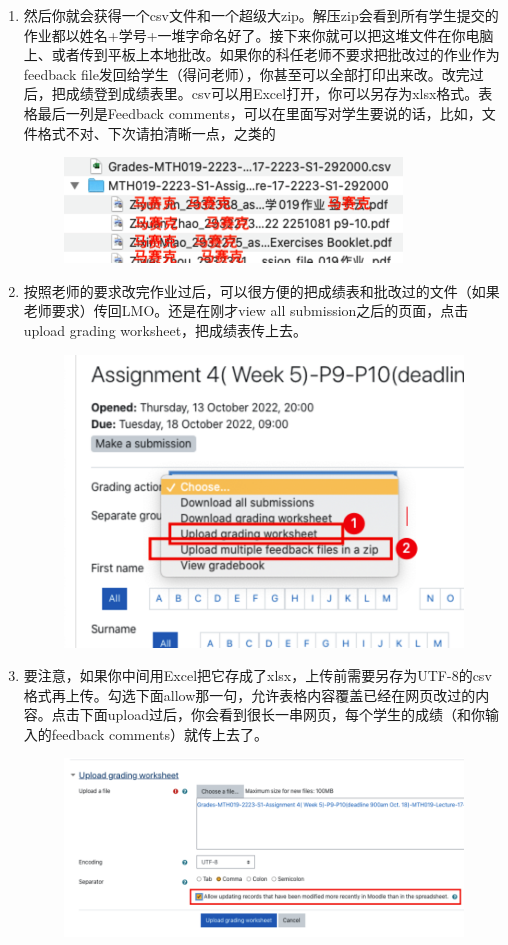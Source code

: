 \begin{enumerate}
\begin{figure}[H]
        \end{figure}
    \item 然后你就会获得一个csv文件和一个超级大zip。解压zip会看到所有学生提交的作业都以姓名+学号+一堆字命名好了。接下来你就可以把这堆文件在你电脑上、或者传到平板上本地批改。如果你的科任老师不要求把批改过的作业作为feedback file发回给学生（得问老师），你甚至可以全部打印出来改。改完过后，把成绩登到成绩表里。csv可以用Excel打开，你可以另存为xlsx格式。表格最后一列是Feedback comments，可以在里面写对学生要说的话，比如，文件格式不对、下次请拍清晰一点，之类的
        \begin{figure}[H]
            \centering
            \includegraphics[width=0.5\columnwidth]{author-folder/Kai.Wu/LMO_Downloaded.png}
        \end{figure}
    \item 按照老师的要求改完作业过后，可以很方便的把成绩表和批改过的文件（如果老师要求）传回LMO。还是在刚才view all submission之后的页面，点击upload grading worksheet，把成绩表传上去。
        \begin{figure}[H]
            \centering
            \includegraphics[width=0.5\columnwidth]{author-folder/Kai.Wu/LMO_upload.png}
        \end{figure}
    \item 要注意，如果你中间用Excel把它存成了xlsx，上传前需要另存为UTF-8的csv格式再上传。勾选下面allow那一句，允许表格内容覆盖已经在网页改过的内容。点击下面upload过后，你会看到很长一串网页，每个学生的成绩（和你输入的feedback comments）就传上去了。
        \begin{figure}[H]
            \centering
            \includegraphics[width=0.8\columnwidth]{author-folder/Kai.Wu/LMO_upload_sheet.png}

\end{figure}
\end{enumerate}
